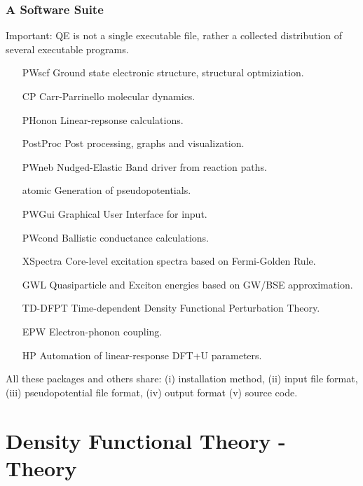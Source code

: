 \documentclass{beamer}
\begin{document}
\begin{frame}
\footnotesize

\frametitle{A Software Suite}

Important: QE is not a single executable file, rather a collected distribution of several
executable programs.\\

\begin{center}
\begin{minipage}{0.85\textwidth}
\begin{tiny}
\begin{itemize}
   \item[\alert{PWscf}] Ground state electronic structure, structural optmiziation.
   \item[CP] Carr-Parrinello molecular dynamics.
   \item[PHonon] Linear-repsonse calculations.
   \item[\alert{PostProc}] Post processing, graphs and visualization.
   \item[PWneb] Nudged-Elastic Band driver from reaction paths.
   \item[atomic] Generation of pseudopotentials.
   \item[PWGui] Graphical User Interface for input.
   \item[PWcond] Ballistic conductance calculations.
   \item[\alert{XSpectra}] Core-level excitation spectra based on Fermi-Golden Rule.
   \item[GWL] Quasiparticle and Exciton energies based on GW/BSE approximation.
   \item[TD-DFPT] Time-dependent Density Functional Perturbation Theory.
   \item[EPW] Electron-phonon coupling.
   \item[HP] Automation of linear-response DFT+U parameters. 
\end{itemize}
\end{tiny}
\end{minipage}
\end{center}

All these packages and others share: (i) installation method, (ii) input file format,
(iii) pseudopotential file format, (iv) output format (v) source code.

\end{frame}

\section{Density Functional Theory - Theory}
\end{document}
